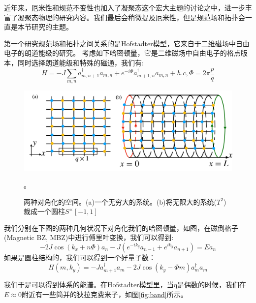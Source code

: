 \documentclass[supercite]{HustGraduPaper}
\begin{document}
近年来，厄米性和规范不变性也加入了凝聚态这个宏大主题的讨论之中，进一步丰富了凝聚态物理的研究内容\cite{Gong2018topo,malzard2015topologically,lourencco2018self,esaki2011edge,Shen2018,Osterloh2005,Goldman2009,zeuner2015observation,leykam2017edge,lee2016anomalous,yuan2014generation,Wu2015,sau2010generic,ozawa2018topological,Wu2013,feng2017non,Yao2018,Yao2018a}。我们最后会稍微提及厄米性，但是规范场和拓扑会一直是本节研究的主题。

第一个研究规范场和拓扑之间关系的是Hofstadter模型\cite{rammal1985landau,Galitski2013,claro1979magnetic,Ningyuan2015,hofstadter1976energy,owens2018quarter,Osterloh2005,Wu2015,aidelsburger2013realization,aidelsburger2015measuring}，它来自于二维磁场中自由电子的朗道能级的研究\cite{aidelsburger2011experimental}。
考虑如下哈密顿量，它是二维磁场中自由电子的格点版本\cite{claro1979magnetic}，同时选择朗道能级和特殊的磁通，我们有:
\begin{equation}
H = -J\sum_{m,n} a^\dagger_{m,n+1} a_{m,n} + e^{-i \Phi} a_{m+1,n}^\dagger a_{m,n} + h.c, \Phi = 2\pi \frac{p}{q}
\end{equation}
\begin{figure}
	\centering
	\includegraphics[width=1\linewidth]{Figures/topoinsu/SP6}
	\caption{两种对角化的空间。(a)一个无穷大的系统。(b)将无限大的系统($T^2$)裁成一个圆柱$S^\times [-1,1]$}。
	\label{fig:sp6}
\end{figure}

我们分别在下图的两种几何状况下对角化我们的哈密顿量，如图，在磁倒格子(Magnetic BZ, MBZ)中进行傅里叶变换，我们可以得到:
\begin{equation}
-2J\cos(k_x + n\Phi) a_n - J(e^{-i k_y}a_{n-1} + e^{i k_y}a_{n+1})=Ea_n
\end{equation}
如果是圆柱结构的，我们可以得到一个好量子数：
\begin{equation}
H(m,k_y) = -Ja^\dagger_{m+1}a_m-2J\cos(k_y-\Phi m)  a_{m}^\dagger a_m
\end{equation}

我们于是可以得到体系的能谱。在Hofstadter模型里，当q是偶数的时候，我们在$E\approx 0 $附近有一些简并的狄拉克费米子，如图\ref{fig:band}所示。
\end{document}
